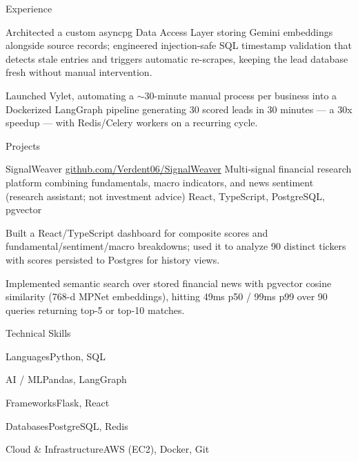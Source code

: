 \documentclass[
	11pt
]{../../../template}
\begin{document}
\begin{rSection}{E}{xperience}
\begin{rSectionEntry}
			\item Architected a custom asyncpg Data Access Layer storing Gemini embeddings alongside source records; engineered injection-safe SQL timestamp validation that detects stale entries and triggers automatic re-scrapes, keeping the lead database fresh without manual intervention.
			\item Launched Vylet, automating a $\sim$30-minute manual process per business into a Dockerized LangGraph pipeline generating 30 scored leads in 30 minutes --- a 30x speedup --- with Redis/Celery workers on a recurring cycle.
		\end{rSectionEntry}
	\end{rSection}

	\begin{rSection}{P}{rojects}
		\begin{rSectionEntry}
			{SignalWeaver}
			{\href{https://github.com/Verdent06/SignalWeaver}{github.com/Verdent06/SignalWeaver}}
			{Multi-signal financial research platform combining fundamentals, macro indicators, and news sentiment (research assistant; not investment advice)}
			{React, TypeScript, PostgreSQL, pgvector}
			{}

			\item Built a React/TypeScript dashboard for composite scores and fundamental/sentiment/macro breakdowns; used it to analyze 90 distinct tickers with scores persisted to Postgres for history views.
			\item Implemented semantic search over stored financial news with pgvector cosine similarity (768-d MPNet embeddings), hitting 49ms p50 / 99ms p99 over 90 queries returning top-5 or top-10 matches.
		\end{rSectionEntry}
	\end{rSection}

	\begin{rSection}{T}{echnical Skills}
		\begin{rSet}{Languages}{Python, SQL}
		\end{rSet}
		\begin{rSet}{AI / ML}{Pandas, LangGraph}
		\end{rSet}
		\begin{rSet}{Frameworks}{Flask, React}
		\end{rSet}
		\begin{rSet}{Databases}{PostgreSQL, Redis}
		\end{rSet}
		\begin{rSet}{Cloud \& Infrastructure}{AWS (EC2), Docker, Git}
		\end{rSet}
	\end{rSection}
\end{document}
